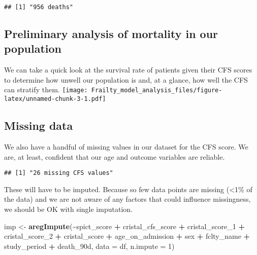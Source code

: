 \documentclass[
]{article}
\newenvironment{Shaded}{\begin{snugshade}}{\end{snugshade}}
\newcommand{\AttributeTok}[1]{\textcolor[rgb]{0.13,0.29,0.53}{#1}}
\newcommand{\DecValTok}[1]{\textcolor[rgb]{0.00,0.00,0.81}{#1}}
\newcommand{\FunctionTok}[1]{\textcolor[rgb]{0.13,0.29,0.53}{\textbf{#1}}}
\newcommand{\NormalTok}[1]{#1}
\newcommand{\OtherTok}[1]{\textcolor[rgb]{0.56,0.35,0.01}{#1}}
\newcommand{\SpecialCharTok}[1]{\textcolor[rgb]{0.81,0.36,0.00}{\textbf{#1}}}
\newcommand{\StringTok}[1]{\textcolor[rgb]{0.31,0.60,0.02}{#1}}
\begin{document}
\begin{verbatim}
## [1] "956 deaths"
\end{verbatim}

\hypertarget{preliminary-analysis-of-mortality-in-our-population}{%
\subsection{Preliminary analysis of mortality in our
population}\label{preliminary-analysis-of-mortality-in-our-population}}

We can take a quick look at the survival rate of patients given their
CFS scores to determine how unwell our population is and, at a glance,
how well the CFS can stratify them.
\texttt{[image: Frailty\_model\_analysis\_files/figure-latex/unnamed-chunk-3-1.pdf]}

\hypertarget{missing-data}{%
\subsection{Missing data}\label{missing-data}}

We also have a handful of missing values in our dataset for the CFS
score. We are, at least, confident that our age and outcome variables
are reliable.

\begin{Shaded}
\end{Shaded}

\begin{verbatim}
## [1] "26 missing CFS values"
\end{verbatim}

These will have to be imputed. Because so few data points are missing
(\textless1\% of the data) and we are not aware of any factors that
could influence missingness, we should be OK with single imputation.

\begin{Shaded}
\begin{Highlighting}[]
\NormalTok{imp }\OtherTok{\textless{}{-}} \FunctionTok{aregImpute}\NormalTok{(}\SpecialCharTok{\textasciitilde{}}\NormalTok{spict\_score }\SpecialCharTok{+}\NormalTok{ cristal\_cfs\_score }\SpecialCharTok{+}\NormalTok{ cristal\_score\_1 }\SpecialCharTok{+}\NormalTok{ cristal\_score\_2 }\SpecialCharTok{+}\NormalTok{ cristal\_score }\SpecialCharTok{+}
\NormalTok{                    age\_on\_admission }\SpecialCharTok{+}\NormalTok{ sex }\SpecialCharTok{+}\NormalTok{ fclty\_name }\SpecialCharTok{+}\NormalTok{ study\_period }\SpecialCharTok{+}\NormalTok{ death\_90d,}
                  \AttributeTok{data =}\NormalTok{ df,}
                  \AttributeTok{n.impute =} \DecValTok{1}\NormalTok{)}
\end{Highlighting}
\end{Shaded}
\end{document}

